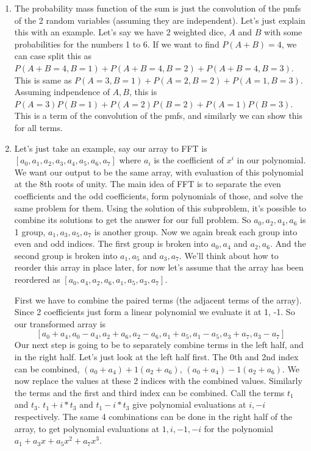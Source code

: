 \documentclass[12pt]{report}
\begin{document}
\begin{enumerate}[label=\textbf{\arabic*.}]
    \item The probability mass function of the sum is just the convolution of the pmfs of the 2 random variables (assuming they are independent).
    Let's just explain this with an example. Let's say we have 2 weighted dice, $A$ and $B$ with some probabilities for the numbers 1 to 6. If we 
    want to find $P(A+B) = 4$, we can case split this as $P(A+B=4, B=1) + P(A+B=4, B=2) + P(A+B=4, B=3)$. This is same as $P(A=3,B=1) + P(A=2,B=2)
    + P(A=1,B=3)$. Assuming indpendence of $A, B$, this is $P(A=3)P(B=1) + P(A=2)P(B=2) + P(A=1)P(B=3)$. This is a term of the convolution of the 
    pmfs, and similarly we can show this for all terms.

    \item Let's just take an example, say our array to FFT is $[a_0, a_1, a_2, a_3, a_4, a_5, a_6, a_7]$ where $a_i$ is the coefficient of $x^i$ in
    our polynomial. We want our output to be the same array, with evaluation of this polynomial at the 8th roots of unity. The main idea of FFT is to 
    separate the even coefficients and the odd coefficients, form polynomials of those, and solve the same problem for them. Using the solution of this
    subproblem, it's possible to combine its solutions to get the answer for our full problem. So $a_0, a_2, a_4, a_6$ is 1 group, $a_1, a_3, a_5, a_7$
    is another group. Now we again break each group into even and odd indices. The first group is broken into $a_0, a_4$ and $a_2, a_6$. And the second 
    group is broken into $a_1, a_5$ and $a_3, a_7$. We'll think about how to reorder this array in place later, for now let's assume that the array has 
    been reordered as $[a_0, a_4, a_2, a_6, a_1, a_5, a_3, a_7]$.

    First we have to combine the paired terms (the adjacent terms of the array). Since 2 coefficients just form a linear polynomial we evaluate it at 1, 
    -1. So our transformed array is 
    \[ [a_0 + a_4, a_0 - a_4, a_2 + a_6, a_2 - a_6, a_1 + a_5, a_1 - a_5, a_3 + a_7, a_3 - a_7] \]
    Our next step is going to be to separately combine terms in the left half, and in the right half. Let's just look at the left half first. The 0th and 
    2nd index can be combined, $(a_0 + a_4) + 1(a_2 + a_6)$, $(a_0 + a_4) - 1(a_2 + a_6)$. We now replace the values at these 2 indices with the combined
    values. Similarly the terms and the first and third index can be combined. Call the terms $t_1$ and $t_3$. $t_1 + i*t_3$ and $t_1 - i*t_3$ give 
    polynomial evaluations at $i, -i$ respectively. The same 4 combinations can be done in the right half of the array, to get polynomial evaluations at 
    $1, i, -1, -i$ for the polynomial $a_1 + a_3 x + a_5 x^2 + a_7 x^3$.


\end{enumerate}
\end{document}
